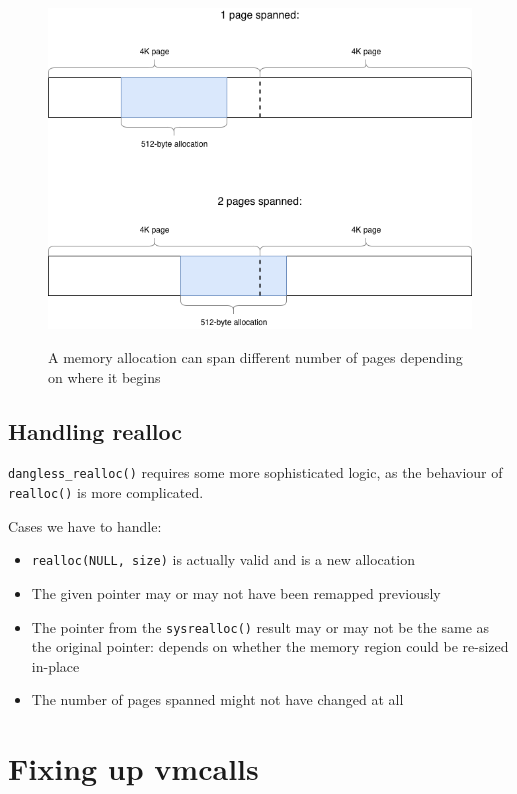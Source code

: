 \begin{figure}
	\centering
	\includegraphics[width=\textwidth]{diagrams/allocation_spanned_pages.png}
	\label{fig:allocation-spanned-pages}
	\caption{A memory allocation can span different number of pages depending on where it begins}
\end{figure}

\subsection{Handling realloc}

\lstinline!dangless_realloc()! requires some more sophisticated logic, as the behaviour of \lstinline!realloc()! is more complicated.

Cases we have to handle:
\begin{itemize}
	\item \lstinline!realloc(NULL, size)! is actually valid and is a new allocation
	\item The given pointer may or may not have been remapped previously
	\item The pointer from the \lstinline!sysrealloc()! result may or may not be the same as the original pointer: depends on whether the memory region could be re-sized in-place
	\item The number of pages spanned might not have changed at all
\end{itemize}


\section{Fixing up vmcalls}

